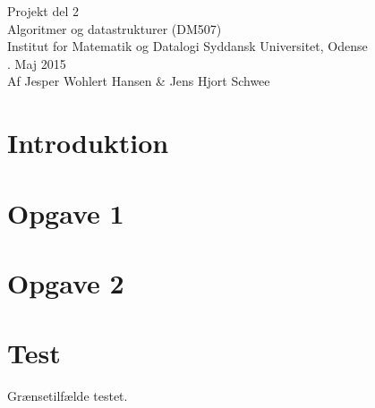\documentclass{article}
\begin{document}
{\centering
\huge
Projekt del 2\\
Algoritmer og datastrukturer (DM507)\\
\large
\bigskip
Institut for Matematik og Datalogi Syddansk Universitet, Odense\\
. Maj 2015\\
\bigskip
Af Jesper Wohlert Hansen \& Jens Hjort Schwee\\
}
\newpage

\section*{Introduktion}

\newpage

\section*{Opgave 1}

\newpage

\section*{Opgave 2}

\newpage

\section*{Test}

Grænsetilfælde testet.
\end{document}
